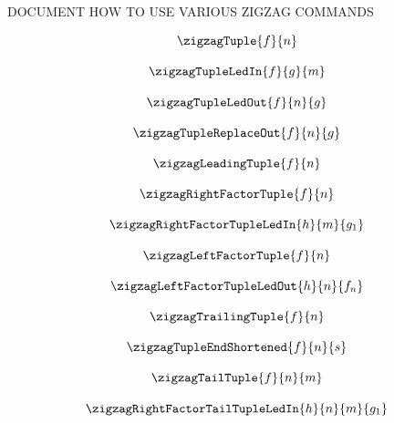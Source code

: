 DOCUMENT HOW TO USE VARIOUS ZIGZAG COMMANDS

\begin{showexample}
\[
\zigzagTuple{f}{n}
\]
\end{showexample}

\begin{showexample}
\[
\zigzagTupleLedIn{f}{g}{m}    
\]
\end{showexample}

\begin{showexample}
\[
\zigzagTupleLedOut{f}{n}{g}    
\]
\end{showexample}

\begin{showexample}
\[
\zigzagTupleReplaceOut{f}{n}{g}    
\]
\end{showexample}

\begin{showexample}
\[
\zigzagLeadingTuple{f}{n} 
\]
\end{showexample}

\begin{showexample}
\[
\zigzagRightFactorTuple{f}{n}
\]
\end{showexample}

\begin{showexample}
\[
\zigzagRightFactorTupleLedIn{h}{m}{g_1}
\]
\end{showexample}

\begin{showexample}
\[
\zigzagLeftFactorTuple{f}{n}
\]
\end{showexample}

\begin{showexample}
\[
\zigzagLeftFactorTupleLedOut{h}{n}{f_n}
\]
\end{showexample}

\begin{showexample}
\[
\zigzagTrailingTuple{f}{n}
\]
\end{showexample}

\begin{showexample}
\[
\zigzagTupleEndShortened{f}{n}{s}
\]
\end{showexample}

\begin{showexample}
\[
\zigzagTailTuple{f}{n}{m}
\]
\end{showexample}

\begin{showexample}
\[
\zigzagRightFactorTailTupleLedIn{h}{n}{m}{g_1}
\]
\end{showexample}

